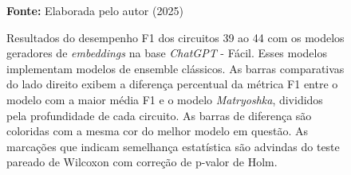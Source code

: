 \begin{figure}
\caption{Resultados do desempenho F1 dos circuitos 39 ao 44 com os modelos geradores de \textit{embeddings} na base \textit{ChatGPT} - Fácil. Esses modelos implementam modelos de ensemble clássicos. As barras comparativas do lado direito exibem a diferença percentual da métrica F1 entre o modelo com a maior média F1 e o modelo \textit{Matryoshka}, divididos pela profundidade de cada circuito. As barras de diferença são coloridas com a mesma cor do melhor modelo em questão. As marcações que indicam semelhança estatística são advindas do teste pareado de Wilcoxon com correção de p-valor de Holm.}
\label{fig:model_transformer:easy:g8}
     \centering
    \centering

      \par\medskip\ABNTEXfontereduzida\selectfont\textbf{Fonte:} Elaborada pelo autor (2025) \par\medskip
\end{figure}